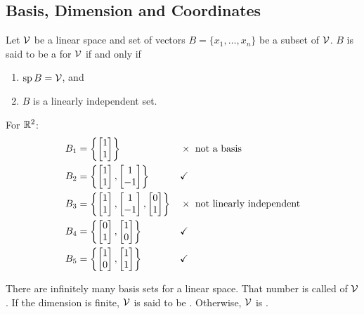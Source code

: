 \subsection{Basis, Dimension and Coordinates}\label{ss:basis}
\begin{definition}
Let $\mathcal{V}$ be a linear space and set of vectors $B=\{x_1,\dots,x_n\}$ be a subset of $\mathcal{V}$. $B$ is said to be a  for $\mathcal{V}$ if and only if
\begin{enumerate}[label=(\roman*)]
\item $\operatorname{sp} B=\mathcal{V}$, and
\item $B$ is a linearly independent set.
\end{enumerate}
\end{definition}

For $\mathbb{R}^2$:
\begin{align*}
B_1 &= \left\{\begin{bmatrix}1\\1\end{bmatrix}\right\} && \times\ \text{not a basis}\\
B_2 &= \left\{\begin{bmatrix}1\\1\end{bmatrix},\begin{bmatrix}1\\-1\end{bmatrix}\right\} && \checkmark\\
B_3 &= \left\{\begin{bmatrix}1\\1\end{bmatrix},\begin{bmatrix}1\\-1\end{bmatrix},\begin{bmatrix}0\\1\end{bmatrix}\right\} && \times\ \text{not linearly independent}\\
B_4 &= \left\{\begin{bmatrix}0\\1\end{bmatrix},\begin{bmatrix}1\\0\end{bmatrix}\right\} && \checkmark\\
B_5 &= \left\{\begin{bmatrix}1\\0\end{bmatrix},\begin{bmatrix}1\\1\end{bmatrix}\right\} && \checkmark
\end{align*}

\begin{remark}
There are infinitely many basis sets for a linear space.  That number is called  of $\mathcal{V}$. If the dimension is finite, $\mathcal{V}$ is said to be . Otherwise, $\mathcal{V}$ is .
\end{remark}

